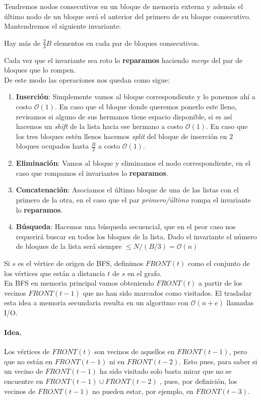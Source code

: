 \documentclass[dcc,uchile]{fcfmcourse}
\theoremstyle{plain}
\theoremstyle{definition}
\begin{document}
\begin{problems}
\problem Tendremos nodos consecutivos en un bloque de memoria externa y además el último nodo de un bloque será el anterior del primero de su bloque consecutivo.\\
Mantendremos el siguiente invariante:
\begin{displayquote}
Hay más de $\frac{2}{3}B$ elementos en cada par de bloques consecutivos.
\end{displayquote}
Cada vez que el invariante sea roto lo \textbf{reparamos} haciendo \textit{merge} del par de bloques que lo rompen.\\
De este modo las operaciones nos quedan como sigue:
\begin{enumerate}
    \item \textbf{Inserción}: Simplemente vamos al bloque correspondiente y lo ponemos ahí a costo $\mathcal{O}(1)$. En caso que el bloque donde queremos ponerlo este lleno, revisamos si alguno de sus hermanos tiene espacio disponible, si es así hacemos un \textit{shift} de la lista hacia ese hermano a costo $\mathcal{O}(1)$. En caso que los tres bloques estén llenos hacemos \textit{split} del bloque de inserción en $2$ bloques ocupados hasta $\frac{B}{2}$ a costo $\mathcal{O}(1)$.
    \item \textbf{Eliminación}: Vamos al bloque y eliminamos el nodo correspondiente, en el caso que rompamos el invariantes lo \textbf{reparamos}.
    \item \textbf{Concatenación}: Asociamos el último bloque de una de las listas con el primero de la otra, en el caso que el par \textit{primero/último} rompa el invariante lo \textbf{reparamos}.
    \item \textbf{Búsqueda}: Hacemos una búsqueda secuencial, que en el peor caso nos requerirá buscar en todos los bloques de la lista. Dado el invariante el número de bloques de la lista será siempre $\le N/(B/3) = \mathcal{O}(n)$
\end{enumerate}
\problem Si $s$ es el vértice de origen de BFS, definimos $FRONT(t)$ como el conjunto de los vértices que están a distancia $t$ de $s$ en el grafo.\\

En BFS en memoria principal vamos obteniendo $FRONT(t)$ a partir de los vecinos $FRONT(t-1)$ que no han sido marcados como visitados. El trasladar esta idea a memoria secundaria resulta en un algoritmo con $\mathcal{O}(n+e)$ llamadas I/O.\\


\paragraph{Idea.}
\idea Los vértices de $FRONT(t)$ son vecinos de aquellos en $FRONT(t-1)$, pero que no están en $FRONT(t-1)$ ni en $FRONT(t-2)$. Esto pues, para saber si un vecino de $FRONT(t-1)$ ha sido visitado solo basta mirar que no se encuentre en $FRONT(t-1)\cup FRONT(t-2)$ , pues, por definición, los vecinos de $FRONT(t-1)$ no pueden estar, por ejemplo, en $FRONT(t-3)$.\\


\end{problems}
\end{document}
